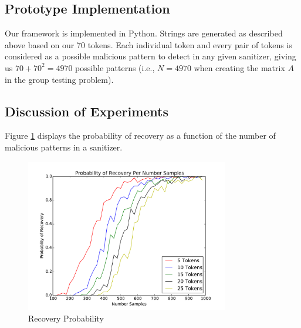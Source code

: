 \subsection{Prototype Implementation}
Our framework is implemented in Python. Strings are generated as described above based on our 70 tokens. Each individual token and every pair of tokens is considered as a possible malicious pattern to detect in any given sanitizer, giving us $70+70^2=4970$ possible patterns (i.e., $N=4970$ when creating the matrix $A$ in the group testing problem). 

\subsection{Discussion of Experiments}
Figure \ref{fig:recovery_probability} displays the probability of recovery as a function of the number of malicious patterns in a sanitizer.
\begin{figure}[!thb]
	\centering
	\includegraphics[width=3.5in]{./recovery_probability_per_samples.pdf}
	\caption{Recovery Probability}
	\label{fig:recovery_probability}
\end{figure}


